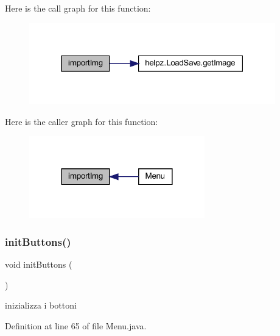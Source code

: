 Here is the call graph for this function\+:
\nopagebreak
\begin{figure}[H]
\begin{center}
\leavevmode
\includegraphics[width=303pt]{classscenes_1_1_menu_ababe61393d9a835b23b1fd6675da3914_cgraph}
\end{center}
\end{figure}
Here is the caller graph for this function\+:\nopagebreak
\begin{figure}[H]
\begin{center}
\leavevmode
\includegraphics[width=216pt]{classscenes_1_1_menu_ababe61393d9a835b23b1fd6675da3914_icgraph}
\end{center}
\end{figure}
\mbox{\label{classscenes_1_1_menu_a27d3ba5afb772cc36c9a432c28975ace}} 
\subsubsection{\texorpdfstring{init\+Buttons()}{initButtons()}}
{\footnotesize\ttfamily void init\+Buttons (\begin{DoxyParamCaption}{ }\end{DoxyParamCaption})\hspace{0.3cm}{\ttfamily [private]}}



inizializza i bottoni 



Definition at line 65 of file Menu.\+java.

